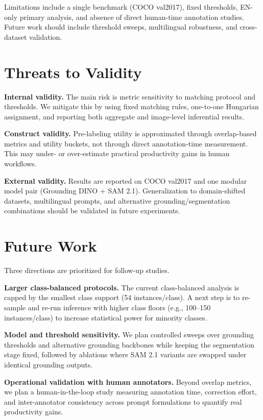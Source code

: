 \documentclass[pdflatex,sn-mathphys-num]{sn-jnl}
\begin{document}
Limitations include a single benchmark (COCO val2017), fixed thresholds, EN-only primary analysis, and absence of direct human-time annotation studies. Future work should include threshold sweeps, multilingual robustness, and cross-dataset validation.

\section{Threats to Validity}

\textbf{Internal validity.} The main risk is metric sensitivity to matching protocol and thresholds. We mitigate this by using fixed matching rules, one-to-one Hungarian assignment, and reporting both aggregate and image-level inferential results.

\textbf{Construct validity.} Pre-labeling utility is approximated through overlap-based metrics and utility buckets, not through direct annotation-time measurement. This may under- or over-estimate practical productivity gains in human workflows.

\textbf{External validity.} Results are reported on COCO val2017 and one modular model pair (Grounding DINO + SAM 2.1). Generalization to domain-shifted datasets, multilingual prompts, and alternative grounding/segmentation combinations should be validated in future experiments.

\section{Future Work}

Three directions are prioritized for follow-up studies.

\textbf{Larger class-balanced protocols.} The current class-balanced analysis is capped by the smallest class support (54 instances/class). A next step is to re-sample and re-run inference with higher class floors (e.g., 100--150 instances/class) to increase statistical power for minority classes.

\textbf{Model and threshold sensitivity.} We plan controlled sweeps over grounding thresholds and alternative grounding backbones while keeping the segmentation stage fixed, followed by ablations where SAM 2.1 variants are swapped under identical grounding outputs.

\textbf{Operational validation with human annotators.} Beyond overlap metrics, we plan a human-in-the-loop study measuring annotation time, correction effort, and inter-annotator consistency across prompt formulations to quantify real productivity gains.
\end{document}
